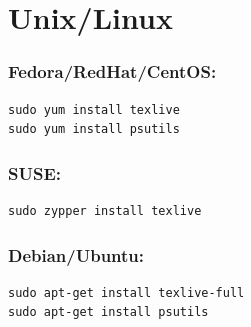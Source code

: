 \section*{Unix/Linux}

\subsubsection*{Fedora/RedHat/CentOS:}
\begin{verbatim}
sudo yum install texlive
sudo yum install psutils
\end{verbatim}


\subsubsection*{SUSE:}
\begin{verbatim}
sudo zypper install texlive
\end{verbatim}


\subsubsection*{Debian/Ubuntu:}
\begin{verbatim}
sudo apt-get install texlive-full
sudo apt-get install psutils
\end{verbatim}
